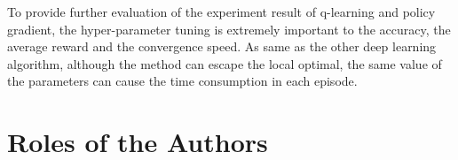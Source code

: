 \documentclass[article]{aaltoseries}
\begin{document}
To provide further evaluation of the experiment result of q-learning and policy gradient, the hyper-parameter tuning is extremely important to the accuracy, the average reward and the convergence speed. As same as the other deep learning algorithm, although the method can escape the local optimal, the same value of the parameters can cause the time consumption in each episode.










\section{Roles of the Authors}
\end{document}
